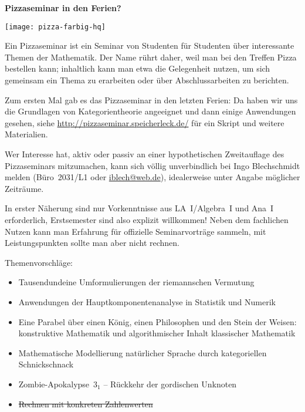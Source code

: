 \documentclass[a4paper,ngerman,landscape,12pt]{scrartcl}
\begin{document}
\begin{center}
  \Huge
  \textbf{\sf Pizzaseminar in den Ferien?}

  \texttt{[image: pizza-farbig-hq]}

  \vfill
  \large
  \begin{minipage}{1.00\textwidth}
    \setlength\parskip{\medskipamount}
    \setlength\columnsep{1.5cm}
    \begin{multicols*}{2}
Ein Pizzaseminar ist ein Seminar von Studenten für Studenten über
interessante Themen der Mathematik. Der Name rührt daher, weil man bei den
Treffen Pizza bestellen kann; inhaltlich kann man etwa die Gelegenheit nutzen,
um sich gemeinsam ein Thema zu erarbeiten oder über
Abschlussarbeiten zu berichten.

Zum ersten Mal gab es das Pizzaseminar in den letzten \mbox{Ferien}: Da haben wir uns
die Grundlagen von Kategorien\-theorie angeeignet und dann einige Anwendungen
gesehen, siehe \url{http://pizzaseminar.speicherleck.de/} für ein Skript und
weitere Materialien.

\columnbreak

Wer Interesse hat, aktiv oder passiv an einer hypothetischen Zweitauflage des
Pizzaseminars mitzumachen, kann sich völlig unverbindlich bei Ingo Blechschmidt
melden (Büro~2031/L1 oder \url{iblech@web.de}), idealerweise unter Angabe
möglicher Zeiträume.

In erster Näherung sind nur Vorkenntnisse aus
LA~I/Algebra~I und Ana~I erforderlich, Erstsemester sind also explizit
willkommen! Neben dem fachlichen Nutzen kann man Erfahrung für offizielle
Seminarvorträge sammeln, mit Leistungspunkten sollte man aber nicht rechnen.
\end{multicols*}
\newpage
  \end{minipage}

  \begin{minipage}{1.00\textwidth}
    Themenvorschläge:
    \begin{itemize}
      \item Tausendundeine Umformulierungen der riemannschen Vermutung
      \item Anwendungen der Hauptkomponentenanalyse in Statistik und Numerik
      \item Eine Parabel über einen König, einen Philosophen und den Stein der
      Weisen: \\ konstruktive Mathematik und algorithmischer Inhalt klassischer
      Mathematik
      \item Mathematische Modellierung natürlicher Sprache durch kategoriellen
      Schnickschnack
      \item Zombie-Apokalypse~$3_1$ -- Rückkehr der gordischen Unknoten
      \item \sout{Rechnen mit konkreten Zahlenwerten}
    \end{itemize}
  \end{minipage}
\end{center}

\end{document}
